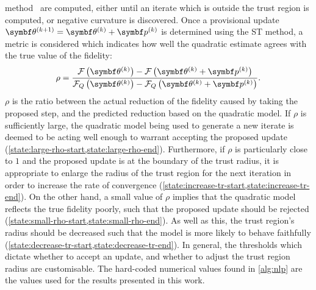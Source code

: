 method~\cite[Chapter 5]{Nocedal2006} are computed, either until an iterate which
is outside the trust region is computed, or negative curvature is discovered.
Once a provisional update $\bthkplusone = \bthk + \bpk$ is determined using the
\ac{ST} method, a metric is considered which indicates how well the
quadratic estimate agrees with the true value of the fidelity:
\begin{equation}
    \rho = \frac
        {\Fthk - \Fthkpk}
        {\FQthk - \FQthkpk}.
\end{equation}
$\rho$ is the ratio between the actual reduction of the fidelity caused
by taking the proposed step, and the predicted reduction based on the quadratic
model. If $\rho$ is sufficiently large, the quadratic model being
used to generate a new iterate is deemed to be acting well enough to warrant
accepting the proposed update
(\cref{state:large-rho-start,state:large-rho-end}).
Furthermore, if $\rho$ is particularly close to $1$ and the proposed
update is at the boundary of the trust radius, it is appropriate to enlarge the
radius of the trust region for the next iteration in order to increase the
rate of convergence
(\cref{state:increase-tr-start,state:increase-tr-end}).
On the other hand, a small value of $\rho$ implies that the
quadratic model reflects the true fidelity poorly, such that the proposed
update should be rejected
(\cref{state:small-rho-start,state:small-rho-end}).
As well as this, the trust region's radius should be
decreased such that the model is more likely to behave faithfully
(\cref{state:decrease-tr-start,state:decrease-tr-end}). In general, the
thresholds which dictate whether to accept an update, and whether to adjust the
trust region radius are customisable. The hard-coded numerical values found in
\cref{alg:nlp} are the values used for the results presented in this work.

